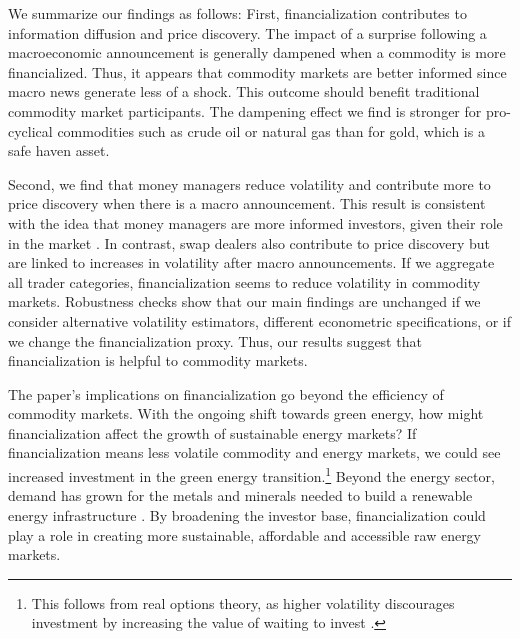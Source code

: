We summarize our findings as follows: First, financialization contributes to information diffusion and price discovery. The impact of a surprise following a macroeconomic announcement is generally dampened when a commodity is more financialized. Thus, it appears that commodity markets are better informed since macro news generate less of a  shock. This outcome should  benefit traditional commodity market participants. The dampening effect we find is stronger for pro-cyclical commodities such as crude oil or natural gas than for gold, which is a safe haven asset.%

Second, we find that money managers reduce volatility and contribute more to price discovery when there is a macro announcement. This result is consistent with the idea that money managers are more informed investors, given their role in the market \citep{fishe2012identifying}. In contrast, swap dealers also contribute to price discovery but are linked to  increases in volatility after macro announcements. If we aggregate all trader categories, financialization seems to reduce volatility in commodity markets. Robustness checks show that our main findings are unchanged if we consider alternative volatility estimators, different econometric specifications, or if we change the financialization proxy.  Thus, our results suggest that financialization is helpful to commodity markets. 


The paper's implications on financialization go beyond the efficiency of commodity markets. With the ongoing shift towards green energy, how might financialization affect the growth of sustainable energy markets? If financialization means less volatile commodity and energy markets, we could see increased investment in the green energy transition.\footnote{This follows from real options theory, as higher volatility discourages investment by increasing the value of waiting to invest \citep*{kellogg2014effect}.}  Beyond the energy sector, demand has grown for the metals and minerals needed to build a renewable energy infrastructure \citep*{knuth2018breakthroughs}. By broadening the investor base, financialization could play a role in creating more sustainable, affordable and accessible raw energy markets.
